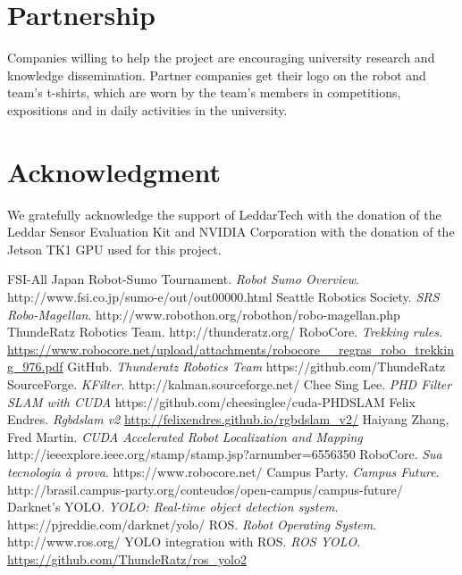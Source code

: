 \documentclass[conference]{IEEEtran}
\begin{document}
\section{Partnership}
Companies willing to help the project are encouraging university research and
knowledge dissemination. Partner companies get their logo on the robot and team's
t-shirts, which are worn by the team's members in competitions, expositions
and in daily activities in the university.

\section*{Acknowledgment}
We gratefully acknowledge the support of LeddarTech with the donation of the
Leddar Sensor Evaluation Kit and NVIDIA Corporation with the donation of
the Jetson TK1 GPU used for this project.

\begin{thebibliography}{30}
    FSI-All Japan Robot-Sumo Tournament. \emph{Robot Sumo Overview}. http://www.fsi.co.jp/sumo-e/out/out00000.html
    Seattle Robotics Society. \emph{SRS Robo-Magellan}. http://www.robothon.org/robothon/robo-magellan.php
    ThundeRatz Robotics Team. http://thunderatz.org/
    RoboCore. \emph{Trekking rules}. \url{https://www.robocore.net/upload/attachments/robocore__regras_robo_trekking_976.pdf}
    GitHub. \emph{Thunderatz Robotics Team} https://github.com/ThundeRatz
    SourceForge. \emph{KFilter}. http://kalman.sourceforge.net/
    Chee Sing Lee. \emph{PHD Filter SLAM with CUDA} https://github.com/cheesinglee/cuda-PHDSLAM
    Felix Endres. \emph{Rgbdslam v2} \url{http://felixendres.github.io/rgbdslam_v2/}
    Haiyang Zhang, Fred Martin. \emph{CUDA Accelerated Robot Localization and Mapping}
    http://ieeexplore.ieee.org/stamp/stamp.jsp?arnumber=6556350
    RoboCore. \emph{Sua tecnologia à prova}. https://www.robocore.net/
    Campus Party. \emph{Campus Future}. http://brasil.campus-party.org/conteudos/open-campus/campus-future/
    Darknet's YOLO. \emph{YOLO: Real-time object detection system}. https://pjreddie.com/darknet/yolo/
    ROS. \emph{Robot Operating System}. http://www.ros.org/
    YOLO integration with ROS. \emph{ROS YOLO}. \url{https://github.com/ThundeRatz/ros_yolo2}

\end{thebibliography}
\end{document}
